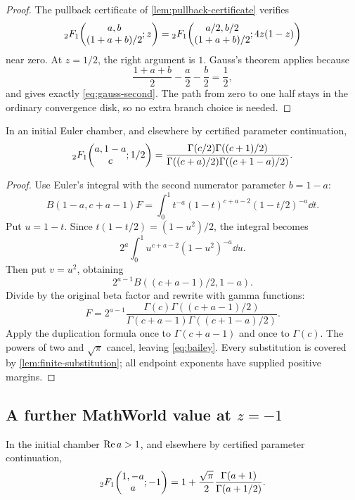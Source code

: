 \begin{proof}
The pullback certificate of \cref{lem:pullback-certificate} verifies
\begin{equation}\label{eq:gauss-second-quad}
 {}_2F_1\!\left(\begin{matrix}a,b\\(1+a+b)/2\end{matrix};z\right)
 ={}_2F_1\!\left(\begin{matrix}a/2,b/2\\(1+a+b)/2\end{matrix};4z(1-z)\right)
\end{equation}
near zero.  At \(z=1/2\), the right argument is \(1\).  Gauss's theorem
applies because
\[
 \frac{1+a+b}{2}-\frac a2-\frac b2=\frac12,
\]
and gives exactly \eqref{eq:gauss-second}.  The path from zero to one half
stays in the ordinary convergence disk, so no extra branch choice is needed.
\end{proof}

\begin{theorem}\label{thm:bailey}
In an initial Euler chamber, and elsewhere by certified parameter
continuation,
\begin{equation}\label{eq:bailey}
 {}_2F_1\!\left(\begin{matrix}a,1-a\\c\end{matrix};1/2\right)
 =\frac{\Gamma(c/2)\Gamma((c+1)/2)}
        {\Gamma((c+a)/2)\Gamma((c+1-a)/2)}.
\end{equation}
\end{theorem}

\begin{proof}
Use Euler's integral with the second numerator parameter \(b=1-a\):
\[
 B(1-a,c+a-1)F
 =\int_0^1t^{-a}(1-t)^{c+a-2}(1-t/2)^{-a}\dd t.
\]
Put \(u=1-t\).  Since
\(t(1-t/2)=(1-u^2)/2\), the integral becomes
\[
 2^a\int_0^1u^{c+a-2}(1-u^2)^{-a}\dd u.
\]
Then put \(v=u^2\), obtaining
\[
 2^{a-1}B((c+a-1)/2,1-a).
\]
Divide by the original beta factor and rewrite with gamma functions:
\[
 F=2^{a-1}
 \frac{\Gamma(c)\Gamma((c+a-1)/2)}
      {\Gamma(c+a-1)\Gamma((c+1-a)/2)}.
\]
Apply the duplication formula once to \(\Gamma(c+a-1)\) and once to
\(\Gamma(c)\).  The powers of two and \(\sqrt\pi\) cancel, leaving
\eqref{eq:bailey}.  Every substitution is covered by
\cref{lem:finite-substitution}; all endpoint exponents have supplied positive
margins.
\end{proof}


\subsection{A further MathWorld value at \(z=-1\)}

\begin{theorem}\label{thm:minus-one-extra}
In the initial chamber \(\operatorname{Re} a>1\), and elsewhere by certified parameter
continuation,
\begin{equation}\label{eq:minus-one-extra}
 {}_2F_1\!\left(\begin{matrix}1,-a\\a\end{matrix};-1\right)
 =1+\frac{\sqrt\pi}{2}\frac{\Gamma(a+1)}{\Gamma(a+1/2)}.
\end{equation}
\end{theorem}

